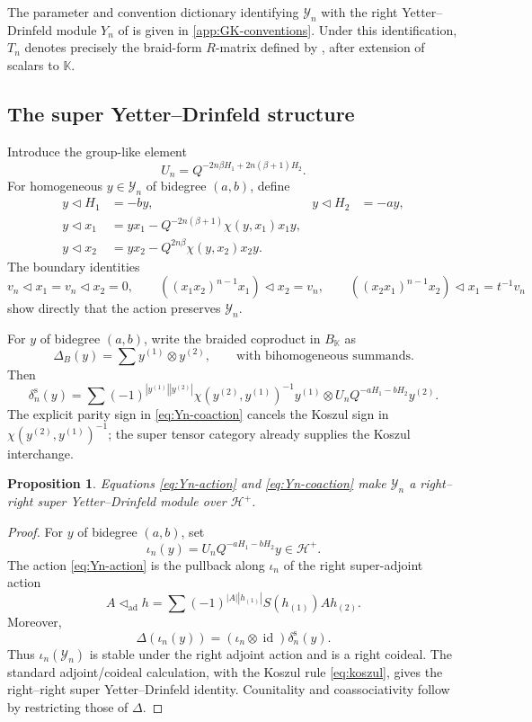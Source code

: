 \documentclass[11pt,a4paper]{article}
\newcommand{\hK}{\mathbb K}
\newcommand{\ot}{\otimes}
\newcommand{\tri}{\mathbin{\triangleleft}}
\newcommand{\id}{\operatorname{id}}
\newtheorem{proposition}[theorem]{Proposition}
\theoremstyle{definition}
\theoremstyle{remark}
\begin{document}
The parameter and convention dictionary identifying \(\mathcal Y_n\) with
the right Yetter--Drinfeld module \(Y_n\) of
\cite[Proposition~7.4]{GK} is given in
\cref{app:GK-conventions}.  Under this identification, \(T_n\) denotes
precisely the braid-form \(R\)-matrix defined by
\cite[Theorem~3.6 and Definition~7.5]{GK}, after extension of scalars to
\(\hK\).

\subsection{The super Yetter--Drinfeld structure}
\label{sec:yd}

Introduce the group-like element
\begin{equation}\label{eq:Un}
 U_n=Q^{-2n\beta H_1+2n(\beta+1)H_2}.
\end{equation}
For homogeneous \(y\in\mathcal Y_n\) of bidegree \((a,b)\), define
\begin{equation}\label{eq:Yn-action}
\begin{aligned}
 y\tri H_1&=-by,& y\tri H_2&=-ay,\\
 y\tri x_1&=yx_1-Q^{-2n(\beta+1)}\chi(y,x_1)x_1y,\\
 y\tri x_2&=yx_2-Q^{2n\beta}\chi(y,x_2)x_2y.
\end{aligned}
\end{equation}
The boundary identities
\[
 v_n\tri x_1=v_n\tri x_2=0,\qquad
 ((x_1x_2)^{n-1}x_1)\tri x_2=v_n,\qquad
 ((x_2x_1)^{n-1}x_2)\tri x_1=t^{-1}v_n
\]
show directly that the action preserves \(\mathcal Y_n\).

For \(y\) of bidegree \((a,b)\), write the braided coproduct in
\(B_{\hK}\) as
\[
 \Delta_B(y)=\sum y^{(1)}\ot y^{(2)},\qquad
 \text{with bihomogeneous summands}.
\]
Then
\begin{equation}\label{eq:Yn-coaction}
 \delta_n^{\mathrm s}(y)
 =
 \sum (-1)^{|y^{(1)}||y^{(2)}|}
 \chi(y^{(2)},y^{(1)})^{-1}y^{(1)}\ot
 U_nQ^{-aH_1-bH_2}y^{(2)}.
\end{equation}
The explicit parity sign in \eqref{eq:Yn-coaction} cancels the Koszul
sign in \(\chi(y^{(2)},y^{(1)})^{-1}\); the super tensor category
already supplies the Koszul interchange.

\begin{proposition}\label{prop:YD}
Equations \eqref{eq:Yn-action} and \eqref{eq:Yn-coaction} make
\(\mathcal Y_n\) a right--right super Yetter--Drinfeld module over
\(\mathcal H^+\).
\end{proposition}

\begin{proof}
For \(y\) of bidegree \((a,b)\), set
\[
 \iota_n(y)=U_nQ^{-aH_1-bH_2}y\in\mathcal H^+.
\]
The action \eqref{eq:Yn-action} is the pullback along \(\iota_n\) of the
right super-adjoint action
\[
 A\tri_{\mathrm{ad}}h
 =\sum(-1)^{|A||h_{(1)}|}S(h_{(1)})Ah_{(2)}.
\]
Moreover,
\[
 \Delta(\iota_n(y))=(\iota_n\ot\id)\delta_n^{\mathrm s}(y).
\]
Thus \(\iota_n(\mathcal Y_n)\) is stable under the right adjoint action
and is a right coideal.  The standard adjoint/coideal calculation, with
the Koszul rule \eqref{eq:koszul}, gives the right--right super
Yetter--Drinfeld identity.  Counitality and coassociativity follow by
restricting those of \(\Delta\).
\end{proof}
\end{document}
